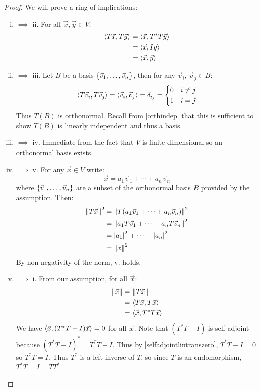 \begin{proof} We will prove a ring of implications:
  \begin{enumerate}[i.] %
    \item{$\implies$ ii.}
      For all $\vec x, \vec y \in V$:
        \begin{align}
          \left\langle T \vec x , T \vec y \right\rangle
            &= \left\langle \vec x , T^* T \vec y \right\rangle \\
            &= \left\langle \vec x , I \vec y \right\rangle \\
            &= \left\langle \vec x , \vec y \right\rangle
        \end{align}
    \item{$\implies$ iii.}
      Let $B$ be a basis $\left\{\vec v_1, \ldots, \vec v_n\right\}$, then for any $\vec v_i$, $\vec v_j \in B$:
        $$\left\langle T \vec v_i , T \vec v_j \right\rangle = \left\langle \vec v_i , \vec v_j \right\rangle = \delta_{ij} = \begin{cases}
          0 & i \ne j \\
          1 & i = j
        \end{cases}$$
      Thus $T(B)$ is orthonormal.
      Recall from \ref{orthindep} that this is sufficient to show $T(B)$ is linearly independent and thus a basis.
    \item{$\implies$ iv.}
      Immediate from the fact that $V$ is finite dimensional so an orthonormal basis exists.
    \item{$\implies$ v.}
      For any $\vec x \in V$ write:
        $$\vec x = a_1 \vec v_1 + \cdots + a_n \vec v_n$$
      where $\left\{\vec v_1, \ldots, \vec v_n\right\}$ are a subset of the orthonormal basis $B$ provided by the assumption. Then:
      \begin{align}
        \left\lVert T \vec x\right\rVert^2
          &= \left\lVert T(a_1\vec v_1 + \cdots + a_n \vec v_n)\right\rVert^2 \\
          &= \left\lVert a_1T\vec v_1 + \cdots + a_nT\vec v_n\right\rVert^2 \\
          &= \left|a_1\right|^2 + \cdots + \left|a_n\right|^2 \\
          &= \left\lVert\vec x\right\rVert^2
      \end{align}
      By non-negativity of the norm, v. holds.
    \item{$\implies$ i.} From our assumption, for all $\vec x$:
      \begin{align}
        \left\lVert\vec x\right\rVert
          &= \left\lVert T \vec x\right\rVert \\
          &= \left\langle T \vec x , T \vec x \right\rangle \\
          &= \left\langle \vec x , T^* T \vec x \right\rangle
      \end{align}
      We have $\left\langle \vec x , (T^*T - I) \vec x \right\rangle = 0$ for all $\vec x$.
      Note that $(T^*T - I)$ is self-adjoint because $(T^*T-I)^* = T^*T - I$.
      Thus by \ref{selfadjointlintranszero}, $T^*T-I = 0$ so $T^*T = I$.
      Thus $T^*$ is a left inverse of $T$, so since $T$ is an endomorphism, $T^*T = I = T T^*$.
  \end{enumerate}
\end{proof}

